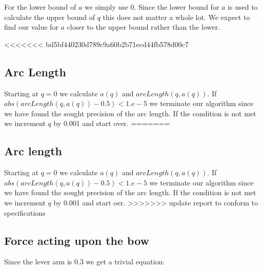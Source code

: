 For the lower bound of $a$ we simply use 0. Since the lower bound for $a$ is used to calculate the upper bound of $q$ this does not matter a whole lot. We expect to find our value for $a$ closer to the upper bound rather than the lower.

<<<<<<< bd5bf440230d789c9a60b2b71ecd44fb578d00c7
\subsection{Arc Length}
Starting at $q=0$ we calculate $a(q)$ and $arcLength(q, a(q))$. If $abs(arcLength(q, a(q))-0.5) < 1.e-5$ we terminate our algorithm since we have found the sought precision of the arc length. If the condition is not met we increment $q$ by 0.001 and start over.
=======
\subsection{Arc length}
Starting at $q=0$ we calculate $a(q)$ and $arcLength(q, a(q))$. If $abs(arcLength(q, a(q))-0.5) < 1.e-5$ we terminate our algorithm since we have found the sought precision of the arc length. If the condition is not met we increment $q$ by 0.001 and start oer.
>>>>>>> update report to conform to specifications

\subsection{Force acting upon the bow}
Since the lever arm is 0.3 we get a trivial equation:

\begin{center}
    
\end{center}
